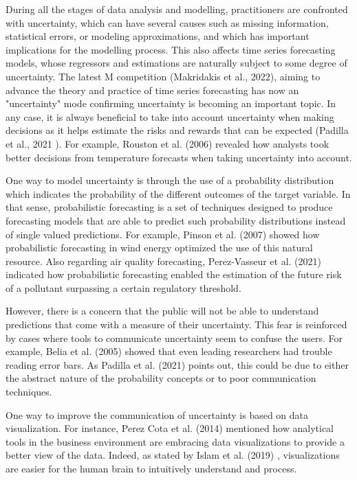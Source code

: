 \documentclass[a4paper,3p,sort&compress]{elsarticle}
\begin{document}
During all the stages of data analysis and modelling, practitioners are
confronted with uncertainty, which can have several causes such as missing
information, statistical errors, or modeling approximations, and which has
important implications for the modelling process. This also affects time series
forecasting models, whose regressors and estimations are naturally subject to
some degree of uncertainty. The latest M competition (Makridakis et al., 2022)\cite{makridakis_m5_2022}, 
aiming to advance the 
theory and practice of time series forecasting has now an "uncertainty" 
mode confirming uncertainty is becoming an important topic. In any case, 
it is always beneficial to take into
account uncertainty when making decisions as it helps estimate the risks and
rewards that can be expected (Padilla et al., 2021 \cite{padilla_uncertainty_2021}).
For example, Rouston et al. (2006) \cite{roulston_laboratory_2006} revealed how
analysts took better decisions from temperature forecasts when taking
uncertainty into account. 

One way to model uncertainty is through the use of a probability distribution
which indicates the probability of the different outcomes of the target
variable. In that sense, probabilistic forecasting is a set of techniques
designed to produce forecasting models that are able to predict such probability
distributions instead of single valued predictions. For example, Pinson et al. (2007)
\cite{pinson_non-parametric_2007} showed how probabilistic forecasting in wind
energy optimized the use of this natural resource. Also regarding air
quality forecasting, Perez-Vasseur et al. (2021) \cite{vasseur_comparing_2021} indicated 
how probabilistic
forecasting enabled the estimation of the future risk of a pollutant surpassing
a certain regulatory threshold.

However, there is a concern that the public will not be able to understand
predictions that come with a measure of their uncertainty. This fear is
reinforced by cases where tools to communicate uncertainty seem to confuse the
users. For example, Belia et al. (2005) \cite{belia_researchers_2005} showed that even
leading researchers had trouble reading error bars. As Padilla et al. (2021)
\cite{padilla_uncertainty_2021} points out, this could be due to either the
abstract nature of the probability concepts or to poor communication techniques.

One way to improve the communication of uncertainty is based on data
visualization. For instance, Perez Cota et al. (2014) \cite{cota_importance_2014}
mentioned how analytical tools in the business environment are embracing data
visualizations to provide a better view of the data. Indeed, as stated by Islam
et al. (2019) \cite{islam_overview_2019}, visualizations are easier for the human brain
to intuitively understand and process.
\end{document}

